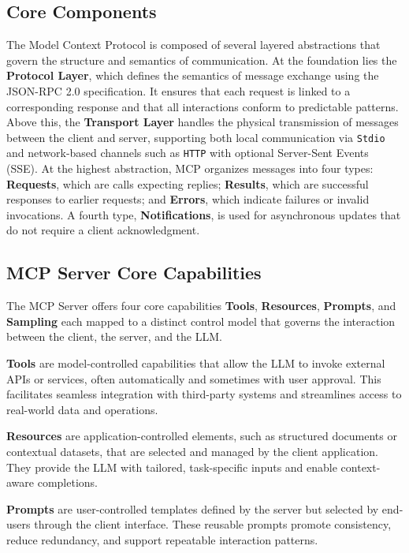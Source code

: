\documentclass{article}
\begin{document}
\subsection{Core Components}
The Model Context Protocol is composed of several layered abstractions that govern the structure and semantics of communication. At the foundation lies the \textbf{Protocol Layer}, which defines the semantics of message exchange using the JSON-RPC 2.0 specification. It ensures that each request is linked to a corresponding response and that all interactions conform to predictable patterns. Above this, the \textbf{Transport Layer} handles the physical transmission of messages between the client and server, supporting both local communication via \texttt{Stdio} and network-based channels such as \texttt{HTTP} with optional Server-Sent Events (SSE). At the highest abstraction, MCP organizes messages into four types: \textbf{Requests}, which are calls expecting replies; \textbf{Results}, which are successful responses to earlier requests; and \textbf{Errors}, which indicate failures or invalid invocations. A fourth type, \textbf{Notifications}, is used for asynchronous updates that do not require a client acknowledgment.


\subsection{MCP Server Core Capabilities}

The MCP Server offers four core capabilities \textbf{Tools}, \textbf{Resources}, \textbf{Prompts}, and \textbf{Sampling} each mapped to a distinct control model that governs the interaction between the client, the server, and the LLM. 

\textbf{Tools} are model-controlled capabilities that allow the LLM to invoke external APIs or services, often automatically and sometimes with user approval. This facilitates seamless integration with third-party systems and streamlines access to real-world data and operations. 

\textbf{Resources} are application-controlled elements, such as structured documents or contextual datasets, that are selected and managed by the client application. They provide the LLM with tailored, task-specific inputs and enable context-aware completions. 

\textbf{Prompts} are user-controlled templates defined by the server but selected by end-users through the client interface. These reusable prompts promote consistency, reduce redundancy, and support repeatable interaction patterns.
\end{document}
